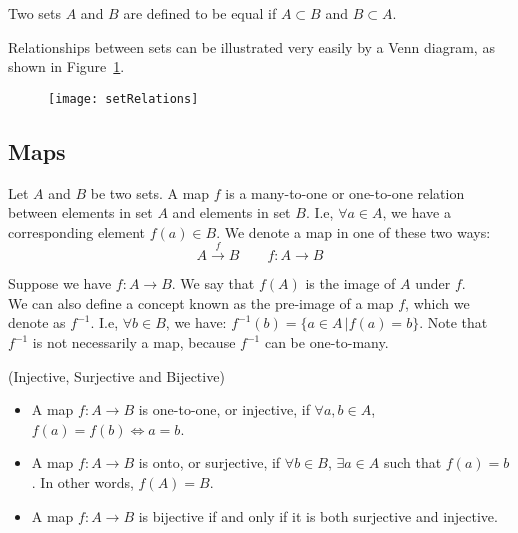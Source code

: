         Two sets $A$ and $B$ are defined to be equal if $A \subset B$ and $B \subset A$.

        Relationships between sets can be illustrated very easily by a Venn
        diagram, as shown in Figure~\ref{fig: set relations}.
        \begin{figure}
          \centering
          \texttt{[image: setRelations]}
          \caption[]{}
          \label{fig: set relations}
        \end{figure}
      \subsection*{Maps}
        \begin{definition}
          Let $A$ and $B$ be two sets. A map $f$ is a many-to-one or
          one-to-one relation between elements in set $A$ and elements in set
          $B$. I.e, $\forall a \in A$, we have a corresponding element $f(a)
          \in B$. We denote a map in one of these two ways:
          \[A \xrightarrow{f} B \quad \quad f: A \rightarrow B\]
        \end{definition}
        \begin{definition}
          Suppose we have $f: A\rightarrow B$. We say that $f(A)$ is the
          image of $A$ under $f$.\\
          We can also define a concept known as the pre-image of a map $f$,
          which we denote as $f^{-1}$. I.e, $\forall b \in B$, we have:
          $f^{-1}(b) = \{a \in A \,|f(a) = b\}$. Note that $f^{-1}$ is not necessarily a map, because $f^{-1}$ can be one-to-many.
        \end{definition}
        \begin{definition}(Injective, Surjective and Bijective)
          \begin{itemize}
            \item{A map $f: A \rightarrow B$ is one-to-one, or injective, if
            $\forall a,b \in A$, $f(a) = f(b) \Leftrightarrow a=b$.}
            \item{A map $f: A \rightarrow B$ is onto, or surjective, if
            $\forall b \in B$, $\exists a \in A$ such that $f(a) = b$. In other words, $f(A) = B$.}
            \item{A map $f: A \rightarrow B$ is bijective if and only if it is both surjective and injective.}
          \end{itemize}
        \end{definition}
